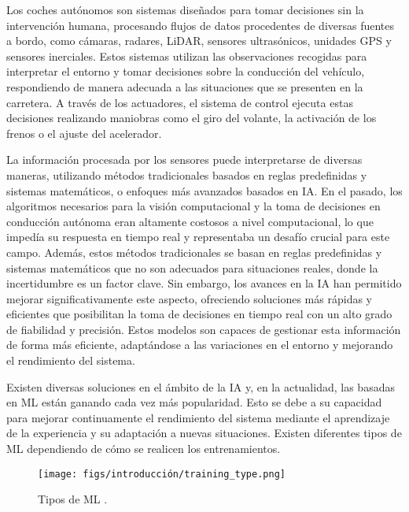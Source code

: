 Los coches autónomos son sistemas diseñados para tomar decisiones sin la intervención humana, procesando flujos de datos procedentes de diversas fuentes a bordo, como cámaras, radares, \ac{LiDAR}, sensores ultrasónicos, unidades \ac{GPS} y sensores inerciales. Estos sistemas utilizan las observaciones recogidas para interpretar el entorno y tomar decisiones sobre la conducción del vehículo, respondiendo de manera adecuada a las situaciones que se presenten en la carretera. A través de los actuadores, el sistema de control ejecuta estas decisiones realizando maniobras como el giro del volante, la activación de los frenos o el ajuste del acelerador.

La información procesada por los sensores puede interpretarse de diversas maneras, utilizando métodos tradicionales basados en reglas predefinidas y sistemas matemáticos, o enfoques más avanzados basados en \ac{IA}. En el pasado, los algoritmos necesarios para la visión computacional y la toma de decisiones en conducción autónoma eran altamente costosos a nivel computacional, lo que impedía su respuesta en tiempo real y representaba un desafío crucial para este campo. Además, estos métodos tradicionales se basan en reglas predefinidas y sistemas matemáticos que no son adecuados para situaciones reales, donde la incertidumbre es un factor clave. Sin embargo, los avances en la \ac{IA} han permitido mejorar significativamente este aspecto, ofreciendo soluciones más rápidas y eficientes que posibilitan la toma de decisiones en tiempo real con un alto grado de fiabilidad y precisión. Estos modelos son capaces de gestionar esta información de forma más eficiente, adaptándose a las variaciones en el entorno y mejorando el rendimiento del sistema.

Existen diversas soluciones en el ámbito de la \ac{IA} y, en la actualidad, las basadas en \ac{ML} están ganando cada vez más popularidad. Esto se debe a su capacidad para mejorar continuamente el rendimiento del sistema mediante el aprendizaje de la experiencia y su adaptación a nuevas situaciones. Existen diferentes tipos de \ac{ML} dependiendo de cómo se realicen los entrenamientos.

\begin{figure}[ht]
\begin{center}
\texttt{[image: figs/introducción/training\_type.png]}
\end{center}
\caption{Tipos de \ac{ML} \cite{foto-ml}.}
\label{ml}
\end{figure}

